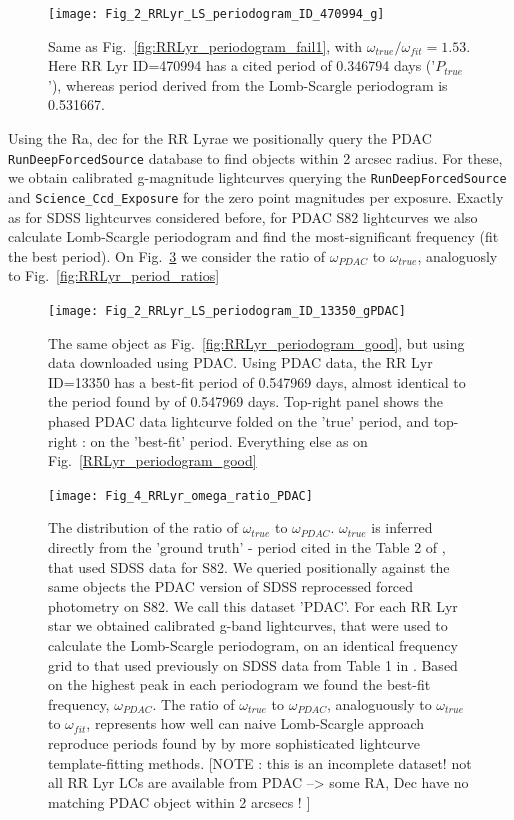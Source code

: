\documentclass[fleqn,usenatbib]{mnras} %
\begin{document}
\begin{figure}
\texttt{[image: Fig\_2\_RRLyr\_LS\_periodogram\_ID\_470994\_g]}
\caption{Same as Fig.~\ref{fig:RRLyr_periodogram_fail1}, with $\omega_{true} / \omega_{fit} = 1.53$. Here  RR Lyr ID=470994 has a cited period of 0.346794  days ('$P_{true}$'), whereas period derived from the Lomb-Scargle periodogram is 0.531667.}
\label{fig:RRLyr_periodogram_fail2}
\end{figure}

Using the Ra, dec for the RR Lyrae we positionally query the PDAC  \verb|RunDeepForcedSource| database to find objects within 2 arcsec radius. For these, we obtain calibrated g-magnitude lightcurves querying the \verb|RunDeepForcedSource| and \verb|Science_Ccd_Exposure| for the zero point magnitudes per exposure. Exactly as for \cite{sesar2010} SDSS lightcurves considered before, for PDAC S82 lightcurves we also calculate Lomb-Scargle periodogram and find the most-significant frequency (fit the best period). On Fig.~\ref{fig:RRLyr_period_ratios_PDAC} we consider the ratio of  $\omega_{PDAC}$ to $\omega_{true}$, analoguosly to Fig.~\ref{fig:RRLyr_period_ratios}



\begin{figure}
\texttt{[image: Fig\_2\_RRLyr\_LS\_periodogram\_ID\_13350\_gPDAC]}
\caption{ The same object as Fig.~\ref{fig:RRLyr_periodogram_good}, but using data downloaded using PDAC. Using PDAC data, the RR Lyr ID=13350 has a best-fit period of 0.547969 days, almost identical to the period found by \citep{sesar2010} of 0.547969 days. Top-right panel shows the phased PDAC data lightcurve folded on the 'true' period, and top-right : on the 'best-fit' period. Everything else as on Fig.~\ref{RRLyr_periodogram_good}}
\label{fig:RRLyr_periodogram_PDAC}
\end{figure}



\begin{figure}
\texttt{[image: Fig\_4\_RRLyr\_omega\_ratio\_PDAC]}
\caption{The distribution of the ratio of $\omega_{true}$ to $\omega_{PDAC}$.  $\omega_{true}$ is inferred directly from the 'ground truth' - period cited in the Table 2 of \citep{sesar2010}, that used SDSS data for S82.  We queried positionally against the same objects the PDAC version of SDSS reprocessed forced photometry on S82. We call this dataset 'PDAC'. For each RR Lyr star we obtained calibrated g-band  lightcurves, that were used to calculate the Lomb-Scargle periodogram, on an identical frequency grid to that used previously on SDSS data from Table 1 in \citep{sesar2010}. Based on the highest peak in each periodogram we found the best-fit frequency, $\omega_{PDAC}$.  The ratio of $\omega_{true}$ to $\omega_{PDAC}$,  analoguously to $\omega_{true}$ to $\omega_{fit}$, represents how well can naive Lomb-Scargle approach reproduce periods found by \citep{sesar2010} by more sophisticated lightcurve template-fitting methods. [NOTE : this is an incomplete dataset! not all RR Lyr LCs are available from PDAC --> some RA, Dec have no matching PDAC object within 2 arcsecs ! ]}
\label{fig:RRLyr_period_ratios_PDAC}
\end{figure}
\end{document}
